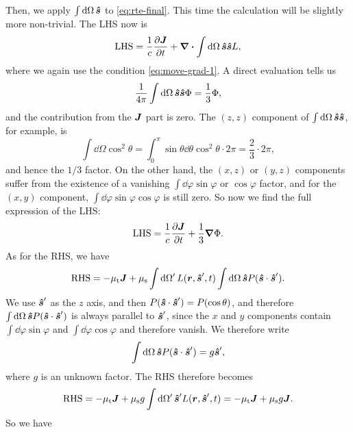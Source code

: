 \documentclass[hyperref, a4paper]{article}
\begin{document}
Then, we apply $\int \dd{\Omega} \vu*{s}$ to \eqref{eq:rte-final}.
This time the calculation will be slightly more non-trivial.
The LHS now is 
\begin{equation}
    \text{LHS} = \frac{1}{c} \pdv{\vb*{J}}{t} + 
    \div \int \dd{\Omega} \vu*{s} \vu*{s} L, 
\end{equation}
where we again use the condition \eqref{eq:move-grad-1}. 
A direct evaluation tells us 
\begin{equation}
    \frac{1}{4\pi} \int \dd{\Omega} \vu*{s} \vu*{s} \Phi = \frac{1}{3} \Phi,
\end{equation}
and the contribution from the $\vb*{J}$ part is zero. 
The $(z, z)$ component of $\int \dd{\Omega} \vu*{s} \vu*{s}$, for example, is 
\[
    \int \dd{\Omega} \cos^2 \theta = 
    \int_{0}^{\pi} \sin \theta \dd{\theta} \cos^2 \theta \cdot 2 \pi 
    = \frac{2}{3} \cdot 2 \pi,
\]
and hence the $1/3$ factor. 
On the other hand, the $(x, z)$ or $(y, z)$ components suffer from 
the existence of a vanishing $\int \dd{\varphi} \sin\varphi$ or $\cos \varphi$ factor, 
and for the $(x, y)$ component, $\int \dd{\varphi} \sin \varphi \cos \varphi$ is still zero. 
So now we find the full expression of the LHS: 
\begin{equation}
    \text{LHS} = \frac{1}{c} \pdv{\vb*{J}}{t} + \frac{1}{3} \grad{\Phi}.
\end{equation}
As for the RHS, we have 
\begin{equation}
    \text{RHS} = - \mu_{\text{t}} \vb*{J} + \mu_{\text{s}} \int \dd{\Omega'} 
    L(\vb*{r}, \vu*{s}', t) \int \dd{\Omega} \vu*{s} P(\vu*{s} \cdot \vu*{s}').
\end{equation}
We use $\vu*{s}'$ as the $z$ axis, and then $P(\vu*{s} \cdot \vu*{s}') = P(\cos \theta)$, 
and therefore $\int \dd{\Omega} \vu*{s} P(\vu*{s} \cdot \vu*{s}')$ 
is always parallel to $\vu*{s}'$, 
since the $x$ and $y$ components contain 
$\int \dd{\varphi} \sin \varphi$ and $\int \dd{\varphi} \cos \varphi$
and therefore vanish.
We therefore write 
\begin{equation}
    \int \dd{\Omega} \vu*{s} P(\vu*{s} \cdot \vu*{s}') = g \vu*{s}',
\end{equation}
where $g$ is an unknown factor.
The RHS therefore becomes 
\begin{equation}
    \text{RHS} = - \mu_{\text{t}} \vb*{J} 
    + \mu_{\text{s}} g \int \dd{\Omega'} \vu*{s}' L(\vb*{r}, \vu*{s}', t) 
    = - \mu_{\text{t}} \vb*{J} 
    + \mu_{\text{s}} g \vb*{J}.
\end{equation}
So we have 
\end{document}
